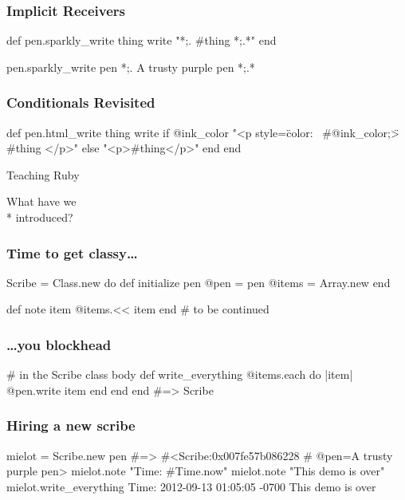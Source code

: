 \documentclass[20pt]{beamer}
\begin{document}
\begin{frame}[fragile]
\frametitle{Implicit Receivers}
\begin{rubycode}
def pen.sparkly_write thing
  write "*;. #{thing} *;.*"
end

pen.sparkly_write pen
*;. A trusty purple pen *;.*
\end{rubycode}
\end{frame}

\begin{frame}[fragile]
\frametitle{Conditionals Revisited}
\begin{rubycode}
def pen.html_write thing
  write if @ink_color
    "<p style=\"color: \
    #{@ink_color};\">
      #{thing}
    </p>"
  else
    "<p>#{thing}</p>"
  end
end
\end{rubycode}
\end{frame}

\begin{frame}
	\par { Teaching Ruby}\par
	\vspace{3cm}\hfill
	{What have we\\* \hfill introduced?}
\end{frame}

\begin{frame}[fragile]
\frametitle{Time to get classy\ldots}
\begin{rubycode}
Scribe = Class.new do
  def initialize pen
    @pen = pen
    @items = Array.new
  end

  def note item
    @items.<< item
  end
  # to be continued
\end{rubycode}
\end{frame}

\begin{frame}[fragile]
\frametitle{\ldots{}you blockhead}
\begin{rubycode}
  # in the Scribe class body
  def write_everything
    @items.each do |item|
      @pen.write item
    end
  end
end
#=> Scribe
\end{rubycode}
\end{frame}

\begin{frame}[fragile]
\frametitle{Hiring a new scribe}
\begin{rubycode}
mielot = Scribe.new pen
#=> #<Scribe:0x007fe57b086228
#   @pen=A trusty purple pen>
mielot.note "Time: #{Time.now}"
mielot.note "This demo is over"
mielot.write_everything
Time: 2012-09-13 01:05:05 -0700
This demo is over
\end{rubycode}
\end{frame}
\end{document}
